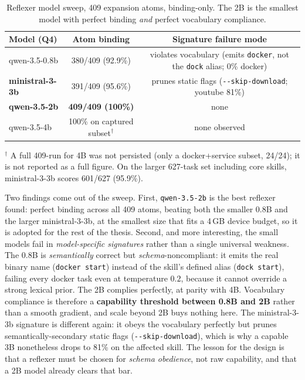 \begin{table}[t]
\centering
\caption{Reflexer model sweep, 409 expansion atoms, binding-only. The 2B is the
smallest model with perfect binding \emph{and} perfect vocabulary compliance.}
\label{tab:reflexer-sweep}
\begin{tabular}{lcc}
\toprule
Model (Q4) & Atom binding & Signature failure mode \\
\midrule
qwen-3.5-0.8b & 380/409 (92.9\%) & violates vocabulary (emits \texttt{docker}, not the \texttt{dock} alias; 0\% docker) \\
\textbf{ministral-3-3b} & 391/409 (95.6\%) & prunes static flags (\texttt{-{}-skip-download}; youtube 81\%) \\
\textbf{qwen-3.5-2b} & \textbf{409/409 (100\%)} & none \\
qwen-3.5-4b & 100\% on captured subset$^{\dagger}$ & none observed \\
\bottomrule
\end{tabular}

\smallskip
{\footnotesize $^{\dagger}$ A full 409-run for 4B was not persisted (only a
docker+service subset, 24/24); it is not reported as a full figure. On the larger
627-task set including core skills, ministral-3-3b scores 601/627 (95.9\%).}
\end{table}

Two findings come out of the sweep. First, \texttt{qwen-3.5-2b} is the best
reflexer found: perfect binding across all 409 atoms, beating both the smaller
0.8B and the larger ministral-3-3b, at the smallest size that fits a 4\,GB device
budget, so it is adopted for the rest of the thesis. Second, and more
interesting, the small models fail in \emph{model-specific signatures} rather than
a single universal weakness. The 0.8B is \emph{semantically} correct but
\emph{schema}-noncompliant: it emits the real binary name (\texttt{docker start})
instead of the skill's defined alias (\texttt{dock start}), failing every docker
task even at temperature $0.2$, because it cannot override a strong lexical prior.
The 2B complies perfectly, at parity with 4B. Vocabulary compliance is therefore a
\textbf{capability threshold between 0.8B and 2B} rather than a smooth gradient,
and scale beyond 2B buys nothing here. The ministral-3-3b signature is different
again: it obeys the vocabulary perfectly but prunes semantically-secondary static
flags (\texttt{-{}-skip-download}), which is why a capable 3B nonetheless drops to
81\% on the affected skill. The lesson for the design is that a reflexer must be
chosen for \emph{schema obedience}, not raw capability, and that a 2B model already
clears that bar.

